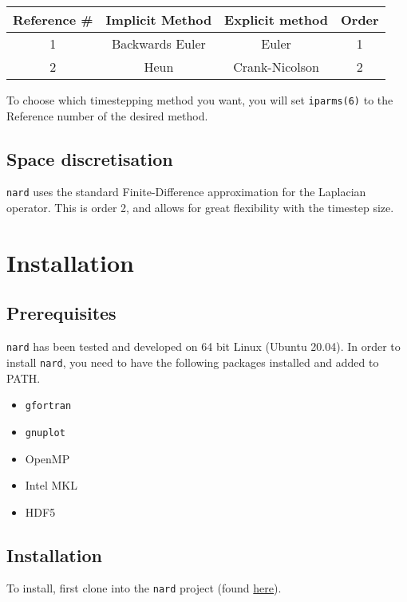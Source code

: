 \documentclass[11pt]{article}
\begin{document}
        {\centering\begin{table}[H]
             \begin{tabular}{c | c | c | c}
             Reference \# & Implicit Method & Explicit method & Order \\
             \hline
             1            & Backwards Euler & Euler           & 1     \\
             2            & Heun            & Crank-Nicolson  & 2
    \end{tabular}\label{tab:table1}
    \end{table}}

    To choose which timestepping method you want, you will set \texttt{iparms(6)} to the Reference number of the desired method.

    \subsection{Space discretisation}
    \texttt{nard} uses the standard Finite-Difference approximation for the Laplacian operator. This is order 2, and allows for great flexibility with the timestep size.

    \section[Installation]{Installation}
    \subsection[Prerequisites]{Prerequisites}
    \texttt{nard} has been tested and developed on 64 bit Linux (Ubuntu 20.04). In order to install \texttt{nard}, you need to have the following packages installed and added to PATH.
    \begin{itemize}
        \item \texttt{gfortran}
        \item \texttt{gnuplot}
        \item OpenMP
        \item Intel MKL
        \item HDF5
    \end{itemize}

    \subsection[Installation]{Installation}
    To install, first clone into the \texttt{nard} project (found \href{https://github.com/JacobVandenberg/nard}{here}).
\end{document}
